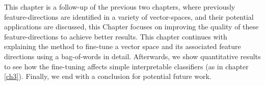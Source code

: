



  



This chapter is a follow-up of the previous two chapters, where previously feature-directions are identified in a variety of vector-spaces, and their potential applications are discussed, this Chapter focuses on improving the quality of these feature-directions to achieve better results. This chapter continues with explaining the method to fine-tune a vector space and its associated feature directions using a bag-of-words in detail. Afterwards, we show  quantitative results to see how the fine-tuning affects simple interpretable classifiers (as in chapter \ref{ch3}). Finally, we end with a conclusion for potential future work.





